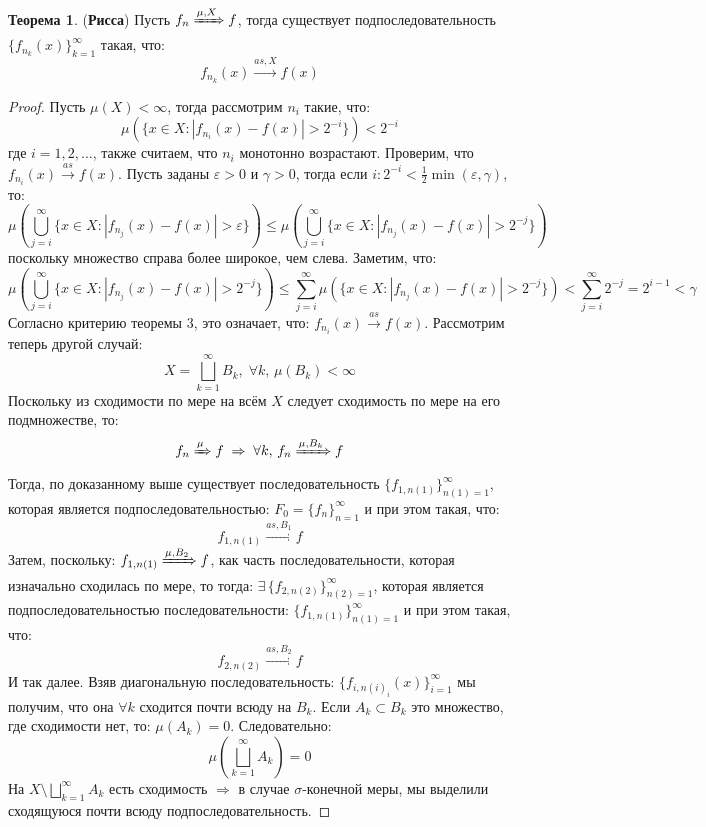 \documentclass[12pt]{article}
\newcommand{\VE}{\varepsilon}
\theoremstyle{definition}
\newtheorem{theorem}{Теорема}
\newcommand{\ddsum}[2]{\displaystyle\sum\limits_{#1}^{#2}}
\begin{document}
\begin{theorem}(\textbf{Рисса})
	Пусть $f_n \xRightarrow{\mu, X} f$, тогда существует подпоследовательность $\{f_{n_k}(x)\}_{k = 1}^{\infty}$ такая, что: 
	$$
		f_{n_k}(x) \xrightarrow{as, X} f(x)
	$$
\end{theorem}
\begin{proof}
	Пусть $\mu(X) < \infty$, тогда рассмотрим $n_i$ такие, что: 
	$$
		\mu(\{x \in X \colon |f_{n_i}(x) - f(x)| > 2^{-i}\}) < 2^{-i}
	$$
	где $i = 1,2, \dotsc$, также считаем, что $n_i$ монотонно возрастают. Проверим, что $f_{n_i}(x) \xrightarrow{as} f(x)$. Пусть заданы $\VE > 0$ и $\gamma > 0$, тогда если $i \colon 2^{-i} < \tfrac{1}{2}\min(\VE,\gamma)$, то:
	$$
		\mu\left(\bigcup\limits_{j = i}^{\infty}\{x \in X \colon |f_{n_j}(x) - f(x)| > \VE\}\right) \leq \mu\left(\bigcup\limits_{j = i}^{\infty}\{x \in X \colon |f_{n_j}(x) - f(x)| > 2^{-j}\}\right)
	$$
	поскольку множество справа более широкое, чем слева. Заметим, что:
	$$
		\mu\left(\bigcup\limits_{j = i}^{\infty}\{x \in X \colon |f_{n_j}(x) - f(x)| > 2^{-j}\}\right) \leq \ddsum{j = i}{\infty}\mu(\{x \in X \colon |f_{n_j}(x) - f(x)| > 2^{-j}\}) < \ddsum{j = i}{\infty}2^{-j} = 2^{i - 1}< \gamma
	$$
	Согласно критерию теоремы $3$, это означает, что: $f_{n_i}(x) \xrightarrow{as} f(x)$. Рассмотрим теперь другой случай: 
	$$
		X = \bigsqcup\limits_{k = 1}^{\infty}B_k, \; \forall k, \, \mu(B_k) < \infty 
	$$
	Поскольку из сходимости по мере на всём $X$ следует сходимость по мере на его подмножестве, то:
	$$
		f_n \xRightarrow{\mu} f \; \Rightarrow \; \forall k, \, f_n \xRightarrow{\mu, B_k} f
	$$ 
	Тогда, по доказанному выше существует последовательность $\{f_{1,n(1)}\}_{n(1) = 1}^{\infty}$, которая является подпоследовательностью: $F_0 = \{f_n\}_{n = 1}^{\infty}$ и при этом такая, что: 
	$$
		f_{1,n(1)} \xrightarrow{as, B_1} f
	$$ 
	Затем, поскольку: $f_{1,n(1)} \xRightarrow{\mu,B_2} f$, как часть последовательности, которая изначально сходилась по мере, то тогда: $\exists \, \{f_{2,n(2)}\}_{n(2) = 1}^{\infty}$, которая является подпоследовательностью последовательности: $\{f_{1,n(1)}\}_{n(1) = 1}^{\infty}$ и при этом такая, что: 
	$$
		f_{2,n(2)} \xrightarrow{as, B_2} f
	$$ 
	И так далее. Взяв диагональную последовательность: $\{f_{i,n(i)_i}(x)\}_{i = 1}^{\infty}$ мы получим, что она $\forall k$ сходится почти всюду на $B_k$. Если $A_k \subset B_k$ это множество, где сходимости нет, то: $\mu(A_k) = 0$. Следовательно: 
	$$
		\mu\left(\bigsqcup\limits_{k = 1}^{\infty}A_k\right) = 0
	$$ 
	На $X \setminus \bigsqcup\limits_{k = 1}^{\infty}A_k$ есть сходимость $\Rightarrow$ в случае $\sigma$-конечной меры, мы выделили сходящуюся почти всюду подпоследовательность.
\end{proof}
\end{document}
